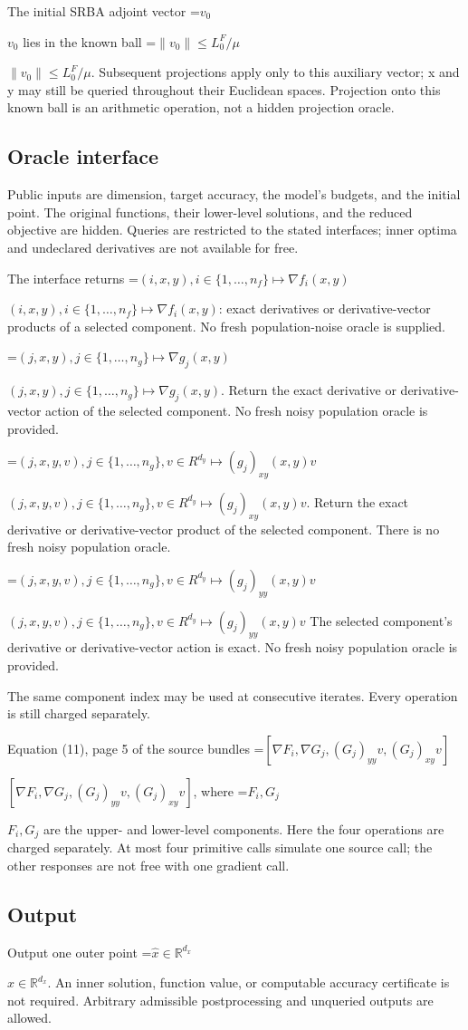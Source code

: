 \documentclass[10pt,a4paper]{article}
\newcommand{\AtlasMath}[1]{\par\begingroup\centering\setbox0=\hbox{$\displaystyle #1$}\ifdim\wd0>1.4\linewidth\typeout{ATLAS WIDE FORMULA: \the\wd0}\fi\ifdim\wd0>\linewidth\resizebox{\linewidth}{!}{\box0}\else\box0\fi\par\endgroup}
\newcommand{\AtlasInlineMath}[1]{\begingroup\setbox0=\hbox{$#1$}\ifdim\wd0>.4\linewidth\endgroup\AtlasMath{#1}\else\endgroup$#1$\fi}
\begin{document}
The initial SRBA adjoint vector \AtlasInlineMath{v_0} lies in the known ball \AtlasInlineMath{\|v_0\|\le L^F_0/\mu}. Subsequent projections apply only to this auxiliary vector; x and y may still be queried throughout their Euclidean spaces. Projection onto this known ball is an arithmetic operation, not a hidden projection oracle.

\subsection{Oracle interface}
Public inputs are dimension, target accuracy, the model's budgets, and the initial point. The original functions, their lower-level solutions, and the reduced objective are hidden. Queries are restricted to the stated interfaces; inner optima and undeclared derivatives are not available for free.

The interface returns \AtlasInlineMath{(i,x,y), i\in\{1,\ldots,n_f\}\longmapsto \nabla f_i(x,y)}: exact derivatives or derivative-vector products of a selected component. No fresh population-noise oracle is supplied.

\AtlasInlineMath{(j,x,y), j\in\{1,\ldots,n_g\}\longmapsto \nabla g_j(x,y)}. Return the exact derivative or derivative-vector action of the selected component. No fresh noisy population oracle is provided.

\AtlasInlineMath{(j,x,y,v), j\in\{1,\ldots,n_g\}, v\in R^{d_y}\longmapsto (g_j)_{xy}(x,y)v}. Return the exact derivative or derivative-vector product of the selected component. There is no fresh noisy population oracle.

\AtlasInlineMath{(j,x,y,v), j\in\{1,\ldots,n_g\}, v\in R^{d_y}\longmapsto (g_j)_{yy}(x,y)v} The selected component's derivative or derivative-vector action is exact. No fresh noisy population oracle is provided.

The same component index may be used at consecutive iterates. Every operation is still charged separately.

Equation (11), page 5 of the source bundles \AtlasInlineMath{[\nabla F_i,\nabla G_j,(G_j)_{yy}v,(G_j)_{xy}v]}, where \AtlasInlineMath{F_i,G_j} are the upper- and lower-level components. Here the four operations are charged separately. At most four primitive calls simulate one source call; the other responses are not free with one gradient call.

\subsection{Output}
Output one outer point \AtlasInlineMath{\widehat{x}\in\mathbb{R}^{d_x}}. An inner solution, function value, or computable accuracy certificate is not required. Arbitrary admissible postprocessing and unqueried outputs are allowed.
\end{document}
